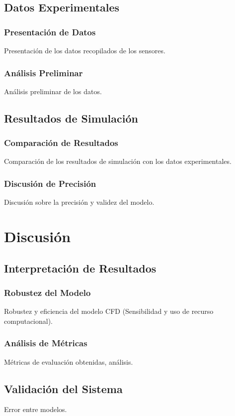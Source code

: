 \documentclass[journal,article,submit,pdftex,moreauthors]{Definitions/mdpi}
\begin{document}
\subsection{Datos Experimentales}
\subsubsection{Presentación de Datos}
Presentación de los datos recopilados de los sensores.

\subsubsection{Análisis Preliminar}
Análisis preliminar de los datos.

\subsection{Resultados de Simulación}
\subsubsection{Comparación de Resultados}
Comparación de los resultados de simulación con los datos experimentales.

\subsubsection{Discusión de Precisión}
Discusión sobre la precisión y validez del modelo.

\section{Discusión}
\subsection{Interpretación de Resultados}
\subsubsection{Robustez del Modelo}
Robustez y eficiencia del modelo CFD (Sensibilidad y uso de recurso computacional).

\subsubsection{Análisis de Métricas}
Métricas de evaluación obtenidas, análisis.

\subsection{Validación del Sistema}
Error entre modelos.
\end{document}
